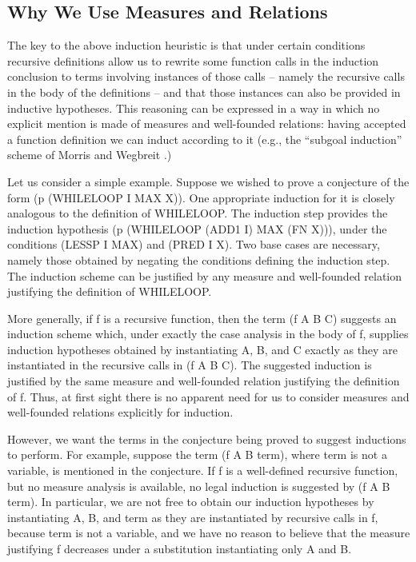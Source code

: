 \documentclass[10pt]{book}
\begin{document}
\subsection{Why We Use Measures and Relations}
The key to the above induction heuristic is that under certain
conditions  recursive definitions
allow us to rewrite some function calls in the induction
conclusion to terms involving instances of those calls -- namely the recursive
calls in the body of the definitions -- and that
those instances can also be provided in inductive hypotheses.
This reasoning can be expressed in a way in which no explicit
mention is made of measures and well-founded relations:
having accepted a function definition we can induct according
to it (e.g., the ``subgoal induction'' scheme
of Morris and Wegbreit \cite{MORRIS}.)

Let us consider a simple example.  Suppose we wished to
prove a conjecture of the form (p (WHILELOOP I MAX X)).  One appropriate
induction for it is closely analogous to the definition of WHILELOOP.
The induction step provides the induction hypothesis
(p (WHILELOOP (ADD1 I) MAX (FN X))), under the conditions (LESSP I MAX)
and (PRED I X).  Two base cases are necessary, namely those obtained
by negating the conditions defining the induction step.
The induction scheme can be justified by any measure
and well-founded relation justifying the definition of WHILELOOP.

More generally, if f is a  recursive function, then the term (f A B C)
suggests an induction scheme which,
under exactly the case analysis
in the body of f, supplies induction hypotheses obtained by instantiating
A, B, and C exactly as they are instantiated in the recursive calls
in (f A B C).  The suggested induction is justified by the
same measure and well-founded relation justifying the definition of f.
Thus, at first sight there is no apparent need for us to consider
measures and well-founded relations explicitly for induction.

However, we want the terms in the conjecture being proved to suggest
inductions to perform.  For example, suppose the term (f A B term),
where term is not a variable, is mentioned in the conjecture.
If f is a well-defined recursive function, but no measure
analysis is available, no legal induction is suggested by (f A B term).
In particular, we are not free to obtain our induction hypotheses by
instantiating A, B, and term as they are instantiated by recursive calls in f,
because term is not a variable, and we have no reason to believe that the
measure justifying f decreases under a substitution instantiating
only A and B.
\end{document}
